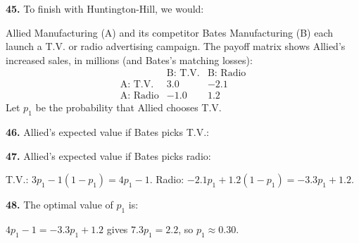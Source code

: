 \documentclass[12pt]{ximera}
\begin{document}
\begin{problem}
\begin{prompt}
\textbf{45.} To finish with Huntington-Hill, we would:
\begin{multipleChoice}
\end{multipleChoice}
\end{prompt}
\end{problem}

\begin{problem}
Allied Manufacturing (A) and its competitor Bates Manufacturing (B) each launch a T.V.
or radio advertising campaign. The payoff matrix shows Allied's increased sales, in
millions (and Bates's matching losses):
\[
\begin{array}{r|rr}
 & \text{B: T.V.} & \text{B: Radio}\\\hline
\text{A: T.V.} & 3.0 & -2.1\\
\text{A: Radio} & -1.0 & 1.2
\end{array}
\]
Let $p_1$ be the probability that Allied chooses T.V.

\begin{prompt}
\textbf{46.} Allied's expected value if Bates picks T.V.:
\begin{multipleChoice}
\end{multipleChoice}
\end{prompt}

\begin{prompt}
\textbf{47.} Allied's expected value if Bates picks radio:
\begin{multipleChoice}
\end{multipleChoice}
\begin{feedback}
T.V.: $3p_1-1(1-p_1)=4p_1-1$. Radio: $-2.1p_1+1.2(1-p_1)=-3.3p_1+1.2$.
\end{feedback}
\end{prompt}

\begin{prompt}
\textbf{48.} The optimal value of $p_1$ is:
\begin{multipleChoice}
\end{multipleChoice}
\begin{feedback}
$4p_1-1=-3.3p_1+1.2$ gives $7.3p_1=2.2$, so $p_1\approx0.30$.
\end{feedback}
\end{prompt}


\end{problem}
\end{document}
